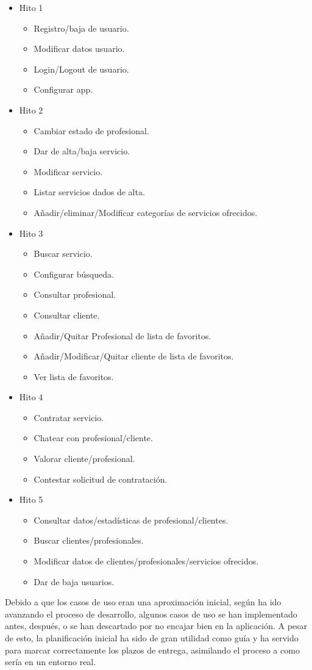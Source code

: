 \begin{itemize}
	\item Hito 1
	\begin{itemize}
		\item Registro/baja de usuario.
		\item Modificar datos usuario.
		\item Login/Logout de usuario.
		\item Configurar app.
	\end{itemize}
	\item Hito 2
	\begin{itemize}
		\item Cambiar estado de profesional.
		\item Dar de alta/baja servicio.
		\item Modificar servicio.
		\item Listar servicios dados de alta.
		\item Añadir/eliminar/Modificar categorías de servicios ofrecidos.
	\end{itemize}
	\item Hito 3
	\begin{itemize}
		\item Buscar servicio.
		\item Configurar búsqueda.
		\item Consultar profesional.
		\item Consultar cliente.
		\item Añadir/Quitar Profesional de lista de favoritos.
		\item Añadir/Modificar/Quitar cliente de lista de favoritos.
		\item Ver lista de favoritos.
	\end{itemize}
	\item Hito 4
	\begin{itemize}
		\item Contratar servicio.
		\item Chatear con profesional/cliente.
		\item Valorar cliente/profesional.
		\item Contestar solicitud de contratación.
	\end{itemize}
	\item Hito 5
	\begin{itemize}
		\item Consultar datos/estadísticas de profesional/clientes.
		\item Buscar clientes/profesionales.
		\item Modificar datos de clientes/profesionales/servicios ofrecidos.
		\item Dar de baja usuarios.
	\end{itemize}
\end{itemize}
Debido a que los casos de uso eran una aproximación inicial, según ha ido avanzando el proceso de desarrollo, algunos casos de uso se han implementado antes, después, o se han descartado por no encajar bien en la aplicación. A pesar de esto, la planificación inicial ha sido de gran utilidad como guía y ha servido para marcar correctamente los plazos de entrega, asimilando el proceso a como sería en un entorno real.
